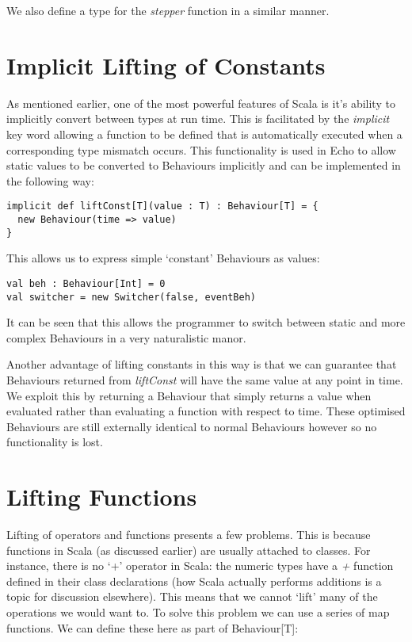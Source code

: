   We also define a type for the \emph{stepper} function in a similar manner.

  \section{Implicit Lifting of Constants}
    As mentioned earlier, one of the most powerful features of Scala is it's ability to implicitly convert between
    types at run time. This is facilitated by the \emph{implicit} key word allowing a function to be defined
    that is automatically executed when a corresponding type mismatch occurs. This functionality is used in Echo to allow 
    static values to be converted to Behaviours implicitly and can be implemented in the following way:

\begin{verbatim}
implicit def liftConst[T](value : T) : Behaviour[T] = {
  new Behaviour(time => value)
}
\end{verbatim}              
    
    This allows us to express simple `constant' Behaviours as values:

\begin{verbatim}
val beh : Behaviour[Int] = 0
val switcher = new Switcher(false, eventBeh)
\end{verbatim}       

    It can be seen that this allows the programmer to switch between static and more complex
    Behaviours in a very naturalistic manor.
    
    Another advantage of lifting constants in this way is that we can guarantee that Behaviours
    returned from \emph{liftConst} will have the same value at any point in time. We exploit this by returning a Behaviour
    that simply returns a value when evaluated rather than evaluating a function with respect to time. These optimised Behaviours are still externally identical to normal Behaviours however so no functionality is lost.
    
    \section{Lifting Functions}
    Lifting of operators and
    functions presents a few problems. This is because functions in Scala (as discussed earlier)
    are usually attached to classes. For instance, there is no `+' operator in Scala: the numeric
    types have a \emph{+} function defined in their class declarations (how Scala actually performs additions
    is a topic for discussion elsewhere). This means that we cannot `lift' many of the operations we
    would want to. To solve this problem we can use a series of map functions. We can define these
    here as part of Behaviour[T]:

